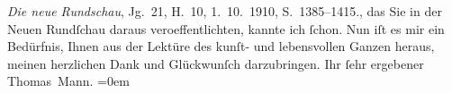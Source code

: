 \begin{ledgroupsized}[t]{13cm}
{{{                                \emph{Die neue Rundschau}, Jg. 21, H. 10,
                                1. 10. 1910, S. 1385–1415.}}}\label{K_L01986_1h}, das Sie in
                    der Neuen Rundſchau daraus veroeffentlichten,
                    kannte ich ſchon. Nun {\pb}iſt es mir ein
                    Bedürfnis, Ihnen aus der Lektüre des kunſt- und lebensvollen Ganzen heraus,
                    meinen herzlichen Dank und Glückwunſch darzubringen.\pend
           \pstart
           Ihr ſehr ergebener{\\[\baselineskip]}\spacefill\mbox{Thomas Mann.}\pend
           \leftskip=0em{}          \endnumbering{}\end{ledgroupsized}  \newcommand{\dateiname}{L01986}\newcommand{\titel}{Thomas Mann an Arthur Schnitzler, 22. 11. 1910}\newcommand{\editorInnen}{Martin Anton Müller und Gerd-Hermann Susen}
            \footnotesize
\begin{ledgroupsized}[t]{11.5cm}
\end{ledgroupsized}
         
      